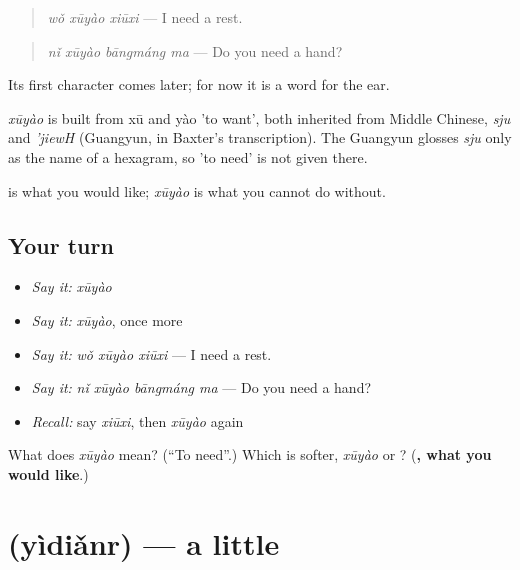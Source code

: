 \begin{quote}
\emph{wǒ xūyào xiūxi} — I need a rest.
\end{quote}

\begin{quote}
\emph{nǐ xūyào bāngmáng ma} — Do you need a hand?
\end{quote}

Its first character comes later; for now it is a word for the ear.

\begin{cousinweb}
\emph{xūyào} is built from xū and yào 'to want', both inherited from Middle Chinese, \emph{sju} and \emph{'jiewH} (Guangyun, in Baxter's transcription). The Guangyun glosses \emph{sju} only as the name of a hexagram, so 'to need' is not given there.
\end{cousinweb}

\begin{grammarlens}[title={What you've built}]
 is what you would like; \emph{xūyào} is what you cannot do without.
\end{grammarlens}

\subsection*{Your turn}
\begin{itemize}
\raggedright
  \item \emph{Say it:} \emph{xūyào}
  \item \emph{Say it:} \emph{xūyào}, once more
  \item \emph{Say it:} \emph{wǒ xūyào xiūxi} — I need a rest.
  \item \emph{Say it:} \emph{nǐ xūyào bāngmáng ma} — Do you need a hand?
  \item \emph{Recall:} say \emph{xiūxi}, then \emph{xūyào} again
\end{itemize}

\begin{tcolorbox}[breakable,colback=teal!4,colframe=teal!35!black,title={Before you move on}]
What does \emph{xūyào} mean? (\textquotedblleft{}To need\textquotedblright{}.) Which is softer, \emph{xūyào} or ? (\textbf{, what you would like}.)
\end{tcolorbox}
\section[\texorpdfstring{\zh{一点儿} (yìdiǎnr)}{一点儿 (yìdiǎnr)}]{ (yìdiǎnr) — a little}

